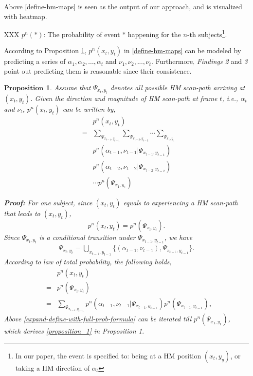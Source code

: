\documentclass[10pt,journal,compsoc]{IEEEtran}
\newtheorem{proposition}[theorem]{$\textbf{Proposition}$}
\begin{document}
 Above \eqref{define-hm-maps} is seen as the output of our approach, and is visualized with heatmap.

XXX $p^n(\ast)$: The probability of event $\ast$ happening for the $n$-th subjects\footnote{In our paper, the event is specified to: being at a HM position $(x_t,y_y)$, or taking a HM direction of $\alpha_t$}.

According to Proposition \ref{lemma1}, $p^n(x_t, y_t)$ in \eqref{define-hm-maps} can be modeled by predicting a series of $\alpha_1,\alpha_2,...,\alpha_t$ and $\nu_1,\nu_2,...,\nu_t$. Furthermore, \textit{Findings 2} and \textit{3} point out predicting them is reasonable since their consistence.
\begin{proposition}
    \label{lemma1}
    Assume that $\Psi_{ x_{t}, y_{t} }$ denotes all possible HM scan-path arriving at $(x_{t}, y_{t})$. Given the direction and magnitude of HM scan-path at frame $t$, i.e., $\alpha_t$ and $\nu_t$, $p^n(x_t, y_t)$ can be written by,
    \begin{eqnarray}
            \label{proposition_1}
            && p^n(x_t, y_t) \nonumber\\
            \nonumber &=& \sum_{ \Psi_{ x_{t-1}, y_{t-1} } } \sum_{ \Psi_{ x_{t-2}, y_{t-2} } } \cdots \sum_{ \Psi_{ x_{1}, y_{1} } }
            \\ \nonumber && p^n( \alpha_{t-1}, \nu_{t-1} | \Psi_{ x_{t-1}, y_{t-1} } )
            \\ \nonumber && p^n( \alpha_{t-2}, \nu_{t-2} | \Psi_{ x_{t-2}, y_{t-2} } )
            \\ && \cdots p^n( \Psi_{ x_{1}, y_{1} } )
        \end{eqnarray}

    \textbf{Proof:}
        For one subject, since $(x_t,y_t)$ equals to experiencing a HM scan-path that leads to $(x_t,y_t)$,
        \begin{equation}
            \label{define}
            p^n(x_t, y_t) = p^n( \Psi_{ x_t, y_t } ).
        \end{equation}
        Since $\Psi_{ x_t, y_t }$ is a conditional transition under $\Psi_{ x_{t-1}, y_{t-1} }$, we have
        \begin{eqnarray}
            \label{expand-path}
             \Psi_{ x_t, y_t } = \bigcup_{x_{t-1}, y_{t-1}} \{ (\alpha_{t-1}, \nu_{t-1}),\Psi_{ x_{t-1}, y_{t-1} } \}.
        \end{eqnarray}
        According to law of total probability, the following holds,
        \begin{eqnarray}
            \label{expand-define-with-full-prob-formula}
            && p^n(x_t, y_t) \nonumber\\
            &=& p^n( \Psi_{ x_t, y_t } ) \nonumber\\
            &=& \sum_{ \Psi_{ x_{t-1}, y_{t-1} } } \!\!\!p^n( \alpha_{t-1}, \nu_{t-1} | \Psi_{ x_{t-1}, y_{t-1} } ) p^n( \Psi_{ x_{t-1}, y_{t-1} } ),
        \end{eqnarray}
        Above \eqref{expand-define-with-full-prob-formula} can be iterated till $p^n( \Psi_{ x_{1}, y_{1} } )$, which derives \eqref{proposition_1} in Proposition 1.

\end{proposition}
\end{document}
